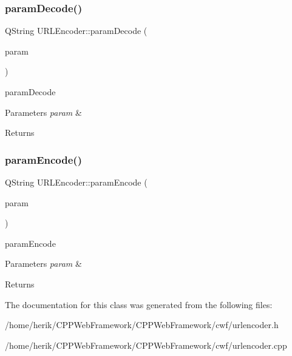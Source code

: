 \subsubsection{\texorpdfstring{param\+Decode()}{paramDecode()}}
{\footnotesize\ttfamily Q\+String U\+R\+L\+Encoder\+::param\+Decode (\begin{DoxyParamCaption}\item[{const Q\+Byte\+Array \&}]{param }\end{DoxyParamCaption})\hspace{0.3cm}{\ttfamily [static]}}



param\+Decode 


\begin{DoxyParams}{Parameters}
{\em param} & \\
\hline
\end{DoxyParams}
\begin{DoxyReturn}{Returns}

\end{DoxyReturn}
\mbox{\label{class_u_r_l_encoder_a1621d8a57c2fd83dabce790a8eeef976}} 
\subsubsection{\texorpdfstring{param\+Encode()}{paramEncode()}}
{\footnotesize\ttfamily Q\+String U\+R\+L\+Encoder\+::param\+Encode (\begin{DoxyParamCaption}\item[{const Q\+Byte\+Array \&}]{param }\end{DoxyParamCaption})\hspace{0.3cm}{\ttfamily [static]}}



param\+Encode 


\begin{DoxyParams}{Parameters}
{\em param} & \\
\hline
\end{DoxyParams}
\begin{DoxyReturn}{Returns}

\end{DoxyReturn}


The documentation for this class was generated from the following files\+:\begin{DoxyCompactItemize}
\item 
/home/herik/\+C\+P\+P\+Web\+Framework/\+C\+P\+P\+Web\+Framework/cwf/urlencoder.\+h\item 
/home/herik/\+C\+P\+P\+Web\+Framework/\+C\+P\+P\+Web\+Framework/cwf/urlencoder.\+cpp\end{DoxyCompactItemize}

